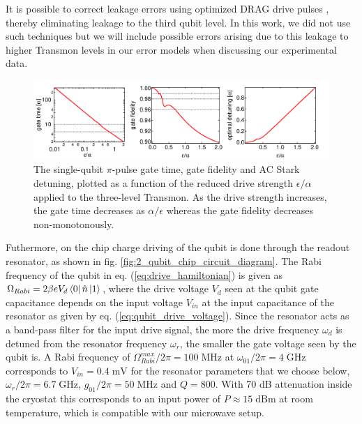 \smallskip

It is possible to correct leakage errors using optimized DRAG drive pulses \cite{lucero_reduced_2010,chow_optimized_2010}, thereby eliminating leakage to the third qubit level. In this work, we did not use such techniques but we will  include possible errors arising due to this leakage to higher Transmon levels in our error models when discussing our experimental data.

\begin{figure}[htp!]
	\centering
	\includegraphics[width=\textwidth]{"./material/mathematica/three_level_driving_errors"}
	\caption[Single-qubit $\pi$-pulse gate time, gate fidelity and AC stark detuning as a function of drive strength]{The single-qubit $\pi$-pulse gate time, gate fidelity and AC Stark detuning, plotted as a function of the reduced drive strength $\epsilon/\alpha$ applied to the three-level Transmon. As the drive strength increases, the gate time decreases as $\alpha/\epsilon$ whereas the gate fidelity decreases non-monotonously.}
	\label{fig:three_level_driving_errors}
\end{figure}

\smallskip 

Futhermore, on the chip charge driving of the qubit is done through the readout resonator, as shown in fig. \ref{fig:2_qubit_chip_circuit_diagram}. The Rabi frequency of the qubit in eq. (\ref{eq:drive_hamiltonian}) is given as $\Omega_{Rabi}= 2 \beta e V_d \left< 0 \right|\hat{n}\left| 1 \right>$, where the drive voltage $V_d$ seen at the qubit gate capacitance depends on the input voltage $V_{in}$ at the input capacitance of the resonator as given by eq. (\ref{eq:qubit_drive_voltage}). Since the resonator acts as a band-pass filter for the input drive signal, the more the drive frequency $\omega_d$ is detuned from the resonator frequency $\omega_r$, the smaller the gate voltage seen by the qubit is. A Rabi frequency of $\Omega_{Rabi}^{max}/2\pi=100\;\mathrm{MHz}$ at $\omega_{01}/2\pi=4\;\mathrm{GHz}$ corresponds to $V_{in}=0.4\;\mathrm{mV}$ for the resonator parameters that we choose below, $\omega_r/2\pi = 6.7\;\mathrm{GHz}$, $g_{01}/2\pi=50\;\mathrm{MHz}$ and $Q=800$. With 70 dB attenuation inside the cryostat this corresponds to an input power of $P\approx 15\;\mathrm{dBm}$ at room temperature, which is compatible with our microwave setup.

